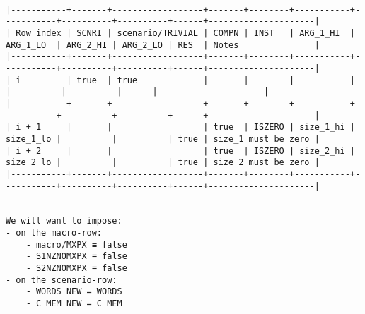 \documentclass[varwidth=\maxdimen,margin=0.5cm,multi={verbatim}]{standalone}
\begin{document}
\begin{verbatim}

|-----------+-------+------------------+-------+--------+-----------+-----------+----------+----------+------+---------------------|
| Row index | SCNRI | scenario/TRIVIAL | COMPN | INST   | ARG_1_HI  | ARG_1_LO  | ARG_2_HI | ARG_2_LO | RES  | Notes               |
|-----------+-------+------------------+-------+--------+-----------+-----------+----------+----------+------+---------------------|
| i         | true  | true             |       |        |           |           |          |          |      |                     |
|-----------+-------+------------------+-------+--------+-----------+-----------+----------+----------+------+---------------------|
| i + 1     |       |                  | true  | ISZERO | size_1_hi | size_1_lo |          |          | true | size_1 must be zero |
| i + 2     |       |                  | true  | ISZERO | size_2_hi | size_2_lo |          |          | true | size_2 must be zero |
|-----------+-------+------------------+-------+--------+-----------+-----------+----------+----------+------+---------------------|


We will want to impose:
- on the macro-row:
	- macro/MXPX ≡ false
	- S1NZNOMXPX ≡ false
	- S2NZNOMXPX ≡ false
- on the scenario-row:
	- WORDS_NEW = WORDS
	- C_MEM_NEW = C_MEM

\end{verbatim}
\end{document}
